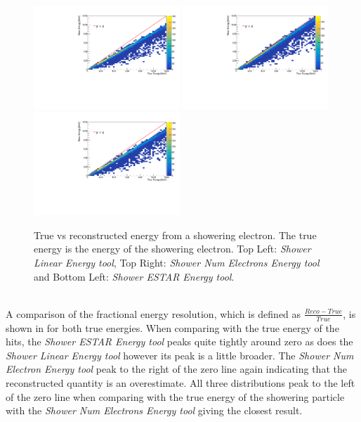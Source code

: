\begin{figure}[h!]
    \centering
    \includegraphics[width = 0.49\textwidth]{figures-chap4/true_vs_reco_showeringE_linear.pdf}
    \includegraphics[width = 0.49\textwidth]{figures-chap4/true_vs_reco_showeringE_oldmethod.pdf}
    \includegraphics[width = 0.49\textwidth]{figures-chap4/true_vs_reco_showeringE_ESTAR.pdf}
    \captionsetup{width=0.45\textwidth}
    \parbox[b]{0.49\textwidth}%
  {
    \caption[True vs reconstructed energy from a showering electron. The true energy is the energy of the showering electron.]
    {True vs reconstructed energy from a showering electron. The true energy is the energy of the showering electron. Top Left: \textit{Shower Linear Energy tool}, Top Right: \textit{Shower Num Electrons Energy tool} and Bottom Left: \textit{Shower ESTAR Energy tool}. \\\\}
    \label{fig:reco_vs_true_showeringE}}
\end{figure}

A comparison of the fractional energy resolution, which is defined as $\frac{Reco - True}{True}$, is shown in  for both true energies. When comparing with the true energy of the hits, the \textit{Shower ESTAR Energy tool} peaks quite tightly around zero as does the \textit{Shower Linear Energy tool} however its peak is a little broader. The \textit{Shower Num Electron Energy tool} peak to the right of the zero line again indicating that the reconstructed quantity is an overestimate. All three distributions peak to the left of the zero line when comparing with the true energy of the showering particle with the \textit{Shower Num Electrons Energy tool} giving the closest result. 


